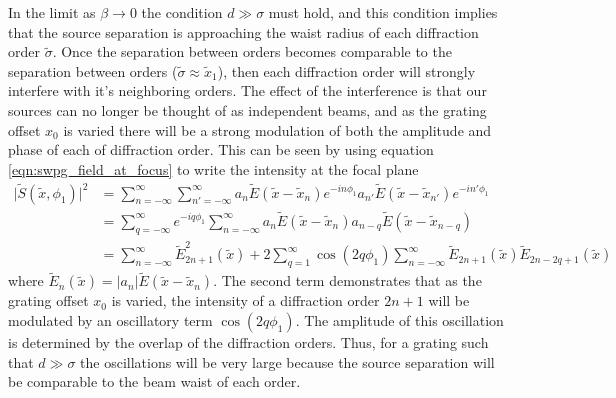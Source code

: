 In the limit as $\beta\rightarrow0$ the condition $d\gg\sigma$ must hold, and this condition implies that the source separation is approaching the waist radius of each diffraction order $\tilde{\sigma}$.  Once the separation between orders becomes comparable to the separation between orders ($\tilde{\sigma}\approx\tilde{x}_1$), then each diffraction order will strongly interfere with it's neighboring orders.  The effect of the interference is that our sources can no longer be thought of as independent beams, and as the grating offset $x_0$ is varied there will be a strong modulation of both the amplitude and phase of each of diffraction order.  This can be seen by using equation \ref{eqn:swpg_field_at_focus} to write the intensity at the focal plane
\begin{equation}
	\begin{aligned}
	\rvert\tilde{S}(\tilde{x},\phi_1)\rvert^2 &= \sum_{n=-\infty}^{\infty}\sum_{n'=-\infty}^{\infty} a_n \tilde{E}(\tilde{x} - \tilde{x}_n)e^{-in\phi_1}a_{n'} \tilde{E}(\tilde{x} - \tilde{x}_{n'})e^{-in'\phi_1}\\
	&= \sum_{q=-\infty}^{\infty}e^{-iq\phi_1}\sum_{n=-\infty}^{\infty} a_n\tilde{E}(\tilde{x}-\tilde{x}_n) a_{n-q}\tilde{E}(\tilde{x}-\tilde{x}_{n-q})\\
	&= \sum_{n=-\infty}^{\infty}\tilde{E}_{2n+1}^2(\tilde{x}) + 2\sum_{q=1}^{\infty}\cos(2q\phi_1) \sum_{n=-\infty}^{\infty}\tilde{E}_{2n+1}(\tilde{x})\tilde{E}_{2n-2q+1}(\tilde{x})
	\end{aligned}
\end{equation}
where $\tilde{E}_n(\tilde{x})=\rvert a_n\rvert\tilde{E}(\tilde{x} - \tilde{x}_n)$. The second term demonstrates that as the grating offset $x_0$ is varied, the intensity of a diffraction order $2n+1$ will be modulated by an oscillatory term $\cos(2q\phi_1)$.  The amplitude of this oscillation is determined by the overlap of the diffraction orders.  Thus, for a grating such that $d\gg\sigma$ the oscillations will be very large because the source separation will be comparable to the beam waist of each order.


